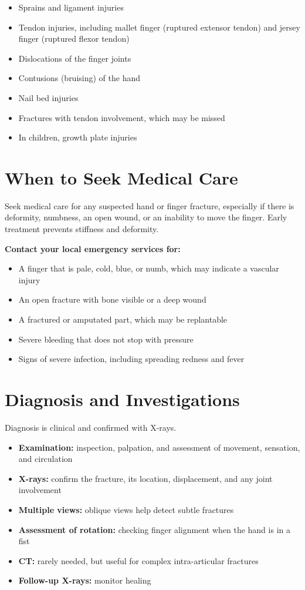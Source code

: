 \begin{itemize}
    \item Sprains and ligament injuries
    \item Tendon injuries, including mallet finger (ruptured extensor tendon) and jersey finger (ruptured flexor tendon)
    \item Dislocations of the finger joints
    \item Contusions (bruising) of the hand
    \item Nail bed injuries
    \item Fractures with tendon involvement, which may be missed
    \item In children, growth plate injuries
\end{itemize}

\section*{When to Seek Medical Care}
Seek medical care for any suspected hand or finger fracture, especially if there is deformity, numbness, an open wound, or an inability to move the finger. Early treatment prevents stiffness and deformity.

\textbf{Contact your local emergency services for:}
\begin{itemize}
    \item A finger that is pale, cold, blue, or numb, which may indicate a vascular injury
    \item An open fracture with bone visible or a deep wound
    \item A fractured or amputated part, which may be replantable
    \item Severe bleeding that does not stop with pressure
    \item Signs of severe infection, including spreading redness and fever
\end{itemize}

\section*{Diagnosis and Investigations}
Diagnosis is clinical and confirmed with X-rays.

\begin{itemize}
    \item \textbf{Examination:} inspection, palpation, and assessment of movement, sensation, and circulation
    \item \textbf{X-rays:} confirm the fracture, its location, displacement, and any joint involvement
    \item \textbf{Multiple views:} oblique views help detect subtle fractures
    \item \textbf{Assessment of rotation:} checking finger alignment when the hand is in a fist
    \item \textbf{CT:} rarely needed, but useful for complex intra-articular fractures
    \item \textbf{Follow-up X-rays:} monitor healing
\end{itemize}

